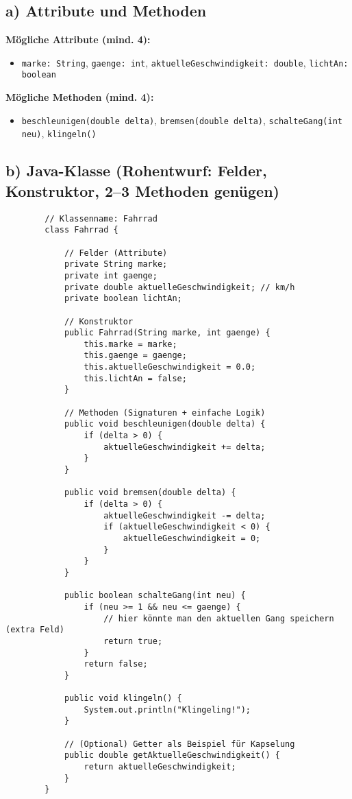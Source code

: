 \documentclass[11pt,a4paper]{scrartcl}
\begin{document}
	\subsection*{a) Attribute und Methoden}
	\textbf{Mögliche Attribute (mind. 4):}
	\begin{itemize}[leftmargin=*,itemsep=0.2em]
		\item \texttt{marke: String}, \texttt{gaenge: int}, \texttt{aktuelleGeschwindigkeit: double}, \texttt{lichtAn: boolean}
	\end{itemize}
	\textbf{Mögliche Methoden (mind. 4):}
	\begin{itemize}[leftmargin=*,itemsep=0.2em]
		\item \texttt{beschleunigen(double delta)}, \texttt{bremsen(double delta)}, \texttt{schalteGang(int neu)}, \texttt{klingeln()}
	\end{itemize}
	
	\subsection*{b) Java-Klasse (Rohentwurf: Felder, Konstruktor, 2–3 Methoden genügen)}
	\begin{lstlisting}
		// Klassenname: Fahrrad
		class Fahrrad {
			
			// Felder (Attribute)
			private String marke;
			private int gaenge;
			private double aktuelleGeschwindigkeit; // km/h
			private boolean lichtAn;
			
			// Konstruktor
			public Fahrrad(String marke, int gaenge) {
				this.marke = marke;
				this.gaenge = gaenge;
				this.aktuelleGeschwindigkeit = 0.0;
				this.lichtAn = false;
			}
			
			// Methoden (Signaturen + einfache Logik)
			public void beschleunigen(double delta) {
				if (delta > 0) {
					aktuelleGeschwindigkeit += delta;
				}
			}
			
			public void bremsen(double delta) {
				if (delta > 0) {
					aktuelleGeschwindigkeit -= delta;
					if (aktuelleGeschwindigkeit < 0) {
						aktuelleGeschwindigkeit = 0;
					}
				}
			}
			
			public boolean schalteGang(int neu) {
				if (neu >= 1 && neu <= gaenge) {
					// hier könnte man den aktuellen Gang speichern (extra Feld)
					return true;
				}
				return false;
			}
			
			public void klingeln() {
				System.out.println("Klingeling!");
			}
			
			// (Optional) Getter als Beispiel für Kapselung
			public double getAktuelleGeschwindigkeit() {
				return aktuelleGeschwindigkeit;
			}
		}
	\end{lstlisting}
	
\end{document}
